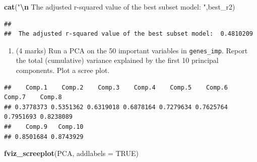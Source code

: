 \documentclass[
]{article}
\newenvironment{Shaded}{\begin{snugshade}}{\end{snugshade}}
\newcommand{\AttributeTok}[1]{\textcolor[rgb]{0.13,0.29,0.53}{#1}}
\newcommand{\ConstantTok}[1]{\textcolor[rgb]{0.56,0.35,0.01}{#1}}
\newcommand{\DecValTok}[1]{\textcolor[rgb]{0.00,0.00,0.81}{#1}}
\newcommand{\FunctionTok}[1]{\textcolor[rgb]{0.13,0.29,0.53}{\textbf{#1}}}
\newcommand{\NormalTok}[1]{#1}
\newcommand{\OtherTok}[1]{\textcolor[rgb]{0.56,0.35,0.01}{#1}}
\newcommand{\SpecialCharTok}[1]{\textcolor[rgb]{0.81,0.36,0.00}{\textbf{#1}}}
\newcommand{\StringTok}[1]{\textcolor[rgb]{0.31,0.60,0.02}{#1}}
\providecommand{\tightlist}{%
  \setlength{\itemsep}{0pt}\setlength{\parskip}{0pt}}
\begin{document}
\begin{Shaded}
\begin{Highlighting}[]
\FunctionTok{cat}\NormalTok{(}\StringTok{"}\SpecialCharTok{\textbackslash{}n}\StringTok{ The adjusted r{-}squared value of the best subset model: "}\NormalTok{,best\_r2)}
\end{Highlighting}
\end{Shaded}

\begin{verbatim}
## 
##  The adjusted r-squared value of the best subset model:  0.4810209
\end{verbatim}

\newpage

\begin{enumerate}
\def\labelenumi{\arabic{enumi}.}
\setcounter{enumi}{5}
\tightlist
\item
  (4 marks) Run a PCA on the 50 important variables in
  \texttt{genes\_imp}. Report the total (cumulative) variance explained
  by the first 10 principal components. Plot a scree plot.
\end{enumerate}

\begin{Shaded}
\end{Shaded}

\begin{verbatim}
##    Comp.1    Comp.2    Comp.3    Comp.4    Comp.5    Comp.6    Comp.7    Comp.8 
## 0.3778373 0.5351362 0.6319018 0.6878164 0.7279634 0.7625764 0.7951693 0.8238089 
##    Comp.9   Comp.10 
## 0.8501684 0.8743929
\end{verbatim}

\begin{Shaded}
\begin{Highlighting}[]
\FunctionTok{fviz\_screeplot}\NormalTok{(PCA, }\AttributeTok{addlabels =} \ConstantTok{TRUE}\NormalTok{)}
\end{Highlighting}
\end{Shaded}
\end{document}
